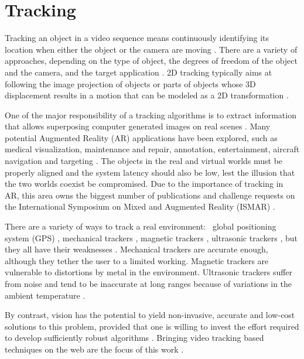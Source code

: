 
\section{Tracking} %
\label{sec:basic_concepts:augmented_reality_tracking}

Tracking an object in a video sequence means continuously identifying its location when either the object or the camera are moving \cite{Lepetit2005}. There are a variety of approaches, depending on the type of object, the degrees of freedom of the object and the camera, and the target application \cite{Lepetit2005,Teichrieb2007}.
2D tracking typically aims at following the image projection of objects or parts of objects whose 3D displacement results in a motion that can be modeled as a 2D transformation \cite{Lepetit2005}.

One of the major responsibility of a tracking algorithms is to extract information that allows superposing computer generated images on real scenes \cite{Lepetit2005}. Many potential Augmented Reality (AR) applications have been explored, such as medical visualization, maintenance and repair, annotation, entertainment, aircraft navigation and targeting \cite{Lepetit2005,Krevelen2010}. The objects in the real and virtual worlds must be properly aligned and the system latency should also be low, lest the illusion that the two worlds coexist be compromised. \cite{Lepetit2005} Due to the importance of tracking in AR, this area owns the biggest number of publications and challenge requests on the International Symposium on Mixed and Augmented Reality (ISMAR) \cite{Zhou2008}.

There are a variety of ways to track a real environment: \eg\ global positioning system (GPS) \cite{Krevelen2010}, mechanical trackers \cite{Krevelen2010}, magnetic trackers \cite{Krevelen2010}, ultrasonic trackers \cite{Krevelen2010} \etc, but they all have their weaknesses \cite{Krevelen2010}. Mechanical trackers are accurate enough, although they tether the user to a limited working. Magnetic trackers are vulnerable to distortions by metal in the environment. Ultrasonic trackers suffer from noise and tend to be inaccurate at long ranges because of variations in the ambient temperature \cite{Lepetit2005}.

By contrast, vision has the potential to yield non-invasive, accurate and low-cost solutions to this problem, provided that one is willing to invest the effort required to develop sufficiently robust algorithms \cite{Lepetit2005}. Bringing video tracking based techniques on the web are the focus of this work \cite{Lepetit2005}.

